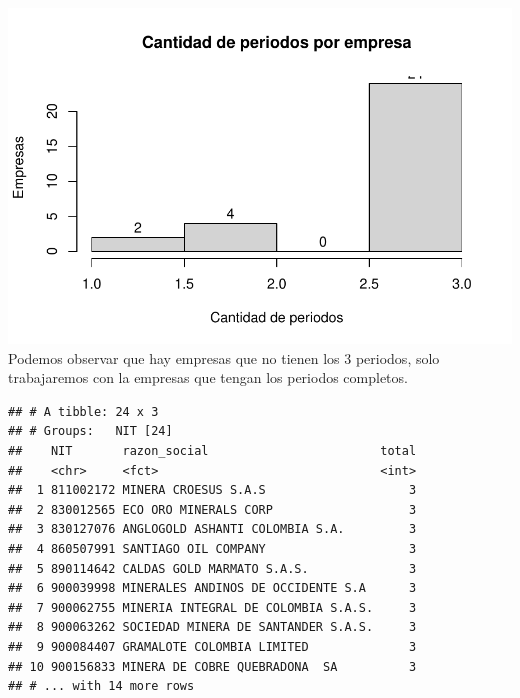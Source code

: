 \documentclass[
  11pt,
  a4paper,
]{book}
\newenvironment{Shaded}{\begin{snugshade}}{\end{snugshade}}
\newcommand{\DataTypeTok}[1]{\textcolor[rgb]{0.13,0.29,0.53}{#1}}
\newcommand{\DecValTok}[1]{\textcolor[rgb]{0.00,0.00,0.81}{#1}}
\newcommand{\KeywordTok}[1]{\textcolor[rgb]{0.13,0.29,0.53}{\textbf{#1}}}
\newcommand{\NormalTok}[1]{#1}
\newcommand{\OperatorTok}[1]{\textcolor[rgb]{0.81,0.36,0.00}{\textbf{#1}}}
\newcommand{\StringTok}[1]{\textcolor[rgb]{0.31,0.60,0.02}{#1}}
\begin{document}
\includegraphics{index_files/figure-latex/unnamed-chunk-47-1.pdf}
Podemos observar que hay empresas que no tienen los 3 periodos, solo
trabajaremos con la empresas que tengan los periodos completos.

\begin{Shaded}
\end{Shaded}

\begin{verbatim}
## # A tibble: 24 x 3
## # Groups:   NIT [24]
##    NIT       razon_social                        total
##    <chr>     <fct>                               <int>
##  1 811002172 MINERA CROESUS S.A.S                    3
##  2 830012565 ECO ORO MINERALS CORP                   3
##  3 830127076 ANGLOGOLD ASHANTI COLOMBIA S.A.         3
##  4 860507991 SANTIAGO OIL COMPANY                    3
##  5 890114642 CALDAS GOLD MARMATO S.A.S.              3
##  6 900039998 MINERALES ANDINOS DE OCCIDENTE S.A      3
##  7 900062755 MINERIA INTEGRAL DE COLOMBIA S.A.S.     3
##  8 900063262 SOCIEDAD MINERA DE SANTANDER S.A.S.     3
##  9 900084407 GRAMALOTE COLOMBIA LIMITED              3
## 10 900156833 MINERA DE COBRE QUEBRADONA  SA          3
## # ... with 14 more rows
\end{verbatim}
\end{document}
